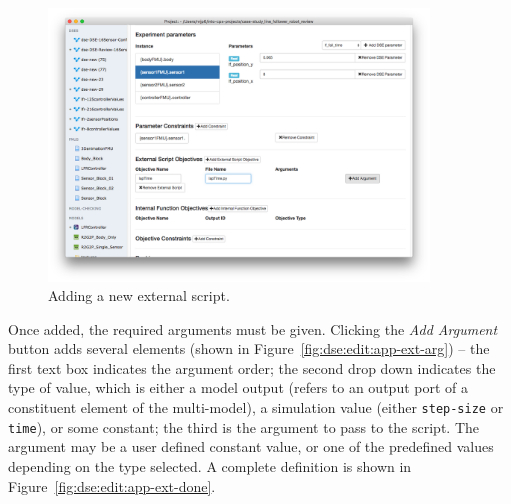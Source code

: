 \begin{figure}[ht]
	\centering
	\includegraphics[width=0.9\textwidth]{figures/dse/app-ext-new}
	\caption{Adding a new external script.}\label{fig:dse:edit:app-ext-new}
\end{figure}
%
%
%

Once added, the required arguments must be given. Clicking the \textit{Add Argument} button adds several elements (shown in Figure~\ref{fig:dse:edit:app-ext-arg}) -- the first text box indicates the argument order;  the second drop down indicates the type of value, which is either a model output (refers to an output port of a constituent element of the multi-model), a simulation value (either \texttt{step-size} or \texttt{time}), or some constant; the third is the argument to pass to the script. The argument may be a user defined constant value, or one of the predefined values depending on the type selected. A complete definition is shown in Figure~\ref{fig:dse:edit:app-ext-done}. 

